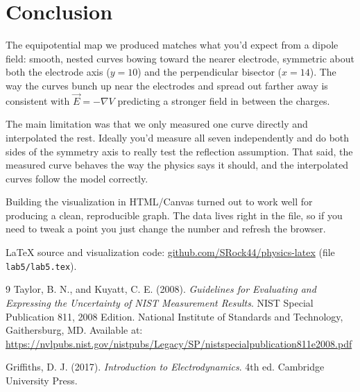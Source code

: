 \documentclass[12pt]{article}
\begin{document}
\section*{Conclusion}

The equipotential map we produced matches what you'd expect from a dipole field: smooth, nested curves bowing toward the nearer electrode, symmetric about both the electrode axis ($y = 10$) and the perpendicular bisector ($x = 14$). The way the curves bunch up near the electrodes and spread out farther away is consistent with $\vec{E} = -\nabla V$ predicting a stronger field in between the charges.

The main limitation was that we only measured one curve directly and interpolated the rest. Ideally you'd measure all seven independently and do both sides of the symmetry axis to really test the reflection assumption. That said, the measured curve behaves the way the physics says it should, and the interpolated curves follow the model correctly.

Building the visualization in HTML/Canvas turned out to work well for producing a clean, reproducible graph. The data lives right in the file, so if you need to tweak a point you just change the number and refresh the browser.

\vspace{0.5cm}
\noindent \LaTeX{} source and visualization code: \href{https://github.com/SRock44/physics-latex}{github.com/SRock44/physics-latex} (file \texttt{lab5/lab5.tex}).

\begin{thebibliography}{9}
Taylor, B. N., and Kuyatt, C. E. (2008). \textit{Guidelines for Evaluating and Expressing the Uncertainty of NIST Measurement Results}. NIST Special Publication 811, 2008 Edition. National Institute of Standards and Technology, Gaithersburg, MD. Available at: \url{https://nvlpubs.nist.gov/nistpubs/Legacy/SP/nistspecialpublication811e2008.pdf}

Griffiths, D. J. (2017). \textit{Introduction to Electrodynamics}. 4th ed. Cambridge University Press.
\end{thebibliography}
\end{document}
